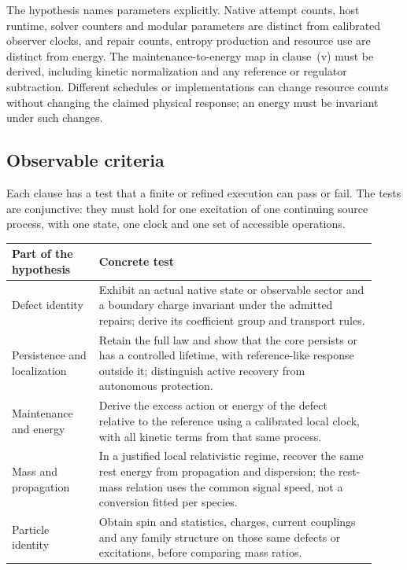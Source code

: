 \documentclass[11pt]{article}
\begin{document}
The hypothesis names parameters explicitly. Native attempt counts, host
runtime, solver counters and modular parameters are distinct from calibrated
observer clocks, and repair counts, entropy production and resource use are
distinct from energy. The maintenance-to-energy map in clause~(v) must be
derived, including kinetic normalization and any reference or regulator
subtraction. Different schedules or implementations can change resource
counts without changing the claimed physical response; an energy must be
invariant under such changes.

\subsection{Observable criteria}

Each clause has a test that a finite or refined execution can pass or fail.
The tests are conjunctive: they must hold for one excitation of one
continuing source process, with one state, one clock and one set of
accessible operations.

\begin{center}
\small
\begin{tabular}{p{0.22\linewidth}p{0.70\linewidth}}
\toprule
Part of the hypothesis & Concrete test \\
\midrule
Defect identity & Exhibit an actual native state or observable sector and a
boundary charge invariant under the admitted repairs; derive its
coefficient group and transport rules. \\
Persistence and localization & Retain the full law and show that the core
persists or has a controlled lifetime, with reference-like response outside
it; distinguish active recovery from autonomous protection. \\
Maintenance and energy & Derive the excess action or energy of the defect
relative to the reference using a calibrated local clock, with all kinetic
terms from that same process. \\
Mass and propagation & In a justified local relativistic regime, recover the
same rest energy from propagation and dispersion; the rest-mass relation uses
the common signal speed, not a conversion fitted per species. \\
Particle identity & Obtain spin and statistics, charges, current couplings
and any family structure on those same defects or excitations, before
comparing mass ratios. \\
\bottomrule
\end{tabular}
\end{center}
\end{document}
